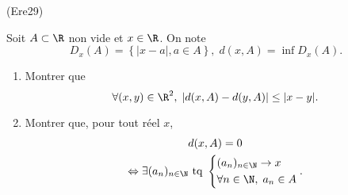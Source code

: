 \begin{tiny}(Ere29)\end{tiny} Soit $A \subset \R$ non vide et $x \in \R$. On note
\[
   D_x(A) = \left\lbrace |x-a|, a\in A\right\rbrace, \; d(x,A) = \inf D_x(A).
 \]
\begin{enumerate}
  \item Montrer que
  \[
    \forall (x,y) \in \R^2, \; \left| d(x,A) - d(y,A)\right| \leq | x - y|.
  \]
  \item Montrer que, pour tout réel $x$,
  \begin{multline*}
    d(x,A) = 0 \\
    \Leftrightarrow \exists (a_n)_{n \in \N} \text{ tq }
    \left\lbrace
    \begin{aligned}
      &(a_n)_{n \in \N}\rightarrow x \\
      &\forall n \in \N, \; a_n \in A
    \end{aligned}
    \right. .
  \end{multline*}

\end{enumerate}

